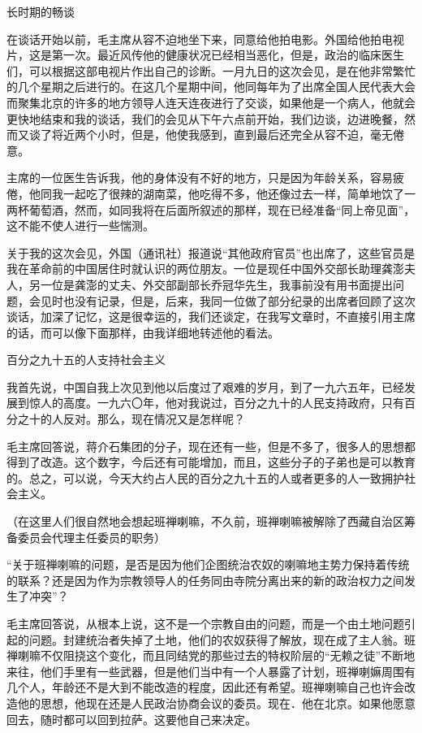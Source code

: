 长时期的畅谈

在谈话开始以前，毛主席从容不迫地坐下来，同意给他拍电影。外国给他拍电视片，这是第一次。最近风传他的健康状况已经相当恶化，但是，政治的临床医生们，可以根据这部电视片作出自己的诊断。一月九日的这次会见，是在他非常繁忙的几个星期之后进行的。在这几个星期中间，他同每年为了出席全国人民代表大会而聚集北京的许多的地方领导人连天连夜进行了交谈，如果他是一个病人，他就会更快地结束和我的谈话，我们的会见从下午六点前开始，我们边谈，边进晚餐，然而又谈了将近两个小时，但是，他使我感到，直到最后还完全从容不迫，毫无倦意。

主席的一位医生告诉我，他的身体没有不好的地方，只是因为年龄关系，容易疲倦，他同我一起吃了很辣的湖南菜，他吃得不多，他还像过去一样，简单地饮了一两杯葡萄酒，然而，如同我将在后面所叙述的那样，现在已经准备“同上帝见面”，这不能不使人进行一些惴测。

关于我的这次会见，外国（通讯社）报道说“其他政府官员”也出席了，这些官员是我在革命前的中国居住时就认识的两位朋友。一位是现任中国外交部长助理龚澎夫人，另一位是龚澎的丈夫、外交部副部长乔冠华先生，我事前没有用书面提出问题，会见时也没有记录，但是，后来，我同一位做了部分纪录的出席者回顾了这次谈话，加深了记忆，这是很幸运的，我们还谈定，在我写文章时，不直接引用主席的话，而可以像下面那样，由我详细地转述他的看法。

百分之九十五的人支持社会主义

我首先说，中国自我上次见到他以后度过了艰难的岁月，到了一九六五年，已经发展到惊人的高度。一九六〇年，他对我说过，百分之九十的人民支持政府，只有百分之十的人反对。那么，现在情况又是怎样呢？

毛主席回答说，蒋介石集团的分子，现在还有一些，但是不多了，很多人的思想都得到了改造。这个数字，今后还有可能增加，而且，这些分子的子弟也是可以教育的。总之，可以说，今天大约占人民的百分之九十五的人或者更多的人一致拥护社会主义。

（在这里人们很自然地会想起班禅喇嘛，不久前，班禅喇嘛被解除了西藏自治区筹备委员会代理主任委员的职务）

“关于班禅喇嘛的问题，是否是因为他们企图统治农奴的喇嘛地主势力保持着传统的联系？还是因为作为宗教领导人的任务同由寺院分离出来的新的政治权力之间发生了冲突”？

毛主席回答说，从根本上说，这不是一个宗教自由的问题，而是一个由土地问题引起的问题。封建统治者失掉了土地，他们的农奴获得了解放，现在成了主人翁。班禅喇嘛不仅阻挠这个变化，而且同结党的那些过去的特权阶层的“无赖之徒”不断地来往，他们手里有一些武器，但是他们当中有一个人暴露了计划，班禅喇嫲周围有几个人，年龄还不是大到不能改造的程度，因此还有希望。班禅喇嘛自己也许会改造他的思想，他现在还是人民政治协商会议的委员。现在．他在北京。如果他愿意回去，随时都可以回到拉萨。这要他自己来决定。

